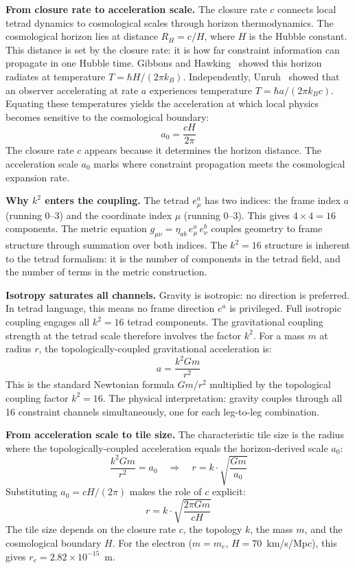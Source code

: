 \documentclass[aps,prd,preprint,superscriptaddress,showpacs,preprintnumbers,amsmath,amssymb,nofootinbib]{revtex4-2}
\begin{document}
\textbf{From closure rate to acceleration scale.} The closure rate $c$ connects local tetrad dynamics to cosmological scales through horizon thermodynamics. The cosmological horizon lies at distance $R_H = c/H$, where $H$ is the Hubble constant. This distance is set by the closure rate: it is how far constraint information can propagate in one Hubble time. Gibbons and Hawking~\cite{gibbons1977} showed this horizon radiates at temperature $T = \hbar H/(2\pi k_B)$. Independently, Unruh~\cite{unruh1976} showed that an observer accelerating at rate $a$ experiences temperature $T = \hbar a/(2\pi k_B c)$. Equating these temperatures yields the acceleration at which local physics becomes sensitive to the cosmological boundary:
\begin{equation}
a_0 = \frac{cH}{2\pi}
\label{eq:a0-horizon}
\end{equation}
The closure rate $c$ appears because it determines the horizon distance. The acceleration scale $a_0$ marks where constraint propagation meets the cosmological expansion rate.

\textbf{Why $k^2$ enters the coupling.} The tetrad $e^a_\mu$ has two indices: the frame index $a$ (running 0--3) and the coordinate index $\mu$ (running 0--3). This gives $4 \times 4 = 16$ components. The metric equation $g_{\mu\nu} = \eta_{ab}\, e^a_\mu\, e^b_\nu$ couples geometry to frame structure through summation over both indices. The $k^2 = 16$ structure is inherent to the tetrad formalism: it is the number of components in the tetrad field, and the number of terms in the metric construction.

\textbf{Isotropy saturates all channels.} Gravity is isotropic: no direction is preferred. In tetrad language, this means no frame direction $e^a$ is privileged. Full isotropic coupling engages all $k^2 = 16$ tetrad components. The gravitational coupling strength at the tetrad scale therefore involves the factor $k^2$. For a mass $m$ at radius $r$, the topologically-coupled gravitational acceleration is:
\begin{equation}
a = \frac{k^2 Gm}{r^2}
\label{eq:a-topology}
\end{equation}
This is the standard Newtonian formula $Gm/r^2$ multiplied by the topological coupling factor $k^2 = 16$. The physical interpretation: gravity couples through all 16 constraint channels simultaneously, one for each leg-to-leg combination.

\textbf{From acceleration scale to tile size.} The characteristic tile size is the radius where the topologically-coupled acceleration equals the horizon-derived scale $a_0$:
\begin{equation}
\frac{k^2 Gm}{r^2} = a_0 \quad \Rightarrow \quad r = k \cdot \sqrt{\frac{Gm}{a_0}}
\label{eq:tile-size}
\end{equation}
Substituting $a_0 = cH/(2\pi)$ makes the role of $c$ explicit:
\begin{equation}
r = k \cdot \sqrt{\frac{2\pi Gm}{cH}}
\label{eq:tile-explicit}
\end{equation}
The tile size depends on the closure rate $c$, the topology $k$, the mass $m$, and the cosmological boundary $H$. For the electron ($m = m_e$, $H = 70$~km/s/Mpc), this gives $r_e = 2.82 \times 10^{-15}$~m.
\end{document}
